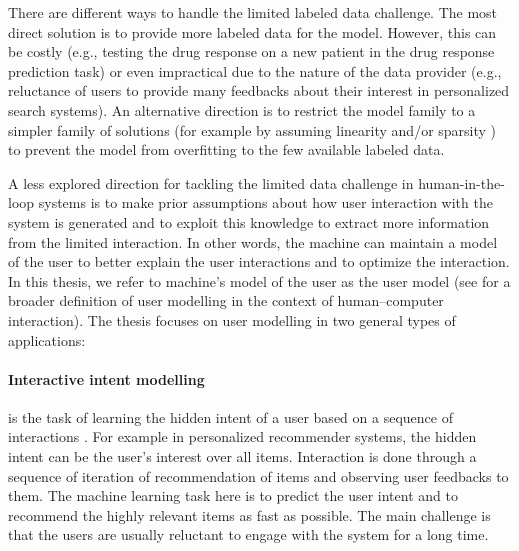 \documentclass[dissertation,math,vertlayout,pdfa,colorlinks]{aaltoseries}
\begin{document}

There are different ways to handle the limited labeled data challenge. The most direct solution is to provide more labeled data for the model. However, this can be costly (e.g., testing the drug response on a new patient in the drug response prediction task) or even impractical due to the nature of the data provider (e.g., reluctance of users to provide many feedbacks about their interest in personalized search systems). An alternative direction is to restrict the model family to a simpler family of solutions (for example by assuming linearity and/or sparsity \cite{lasso2011}) to prevent the model from overfitting to the few available labeled data. 

A less explored direction for tackling the limited data challenge in human-in-the-loop systems is to make prior assumptions about how user interaction with the system is generated and to exploit this knowledge to extract more information from the limited interaction. In other words, the machine can maintain a model of the user to better explain the user interactions and to optimize the interaction. In this thesis, we refer to machine's model of the user as the user model (see \cite{user_modelling_2001} for a broader definition of user modelling in the context of human--computer interaction). The thesis focuses on user modelling in two general types of applications:

\paragraph{Interactive intent modelling} is the task of learning the hidden intent of a user based on a sequence of interactions \cite{ruotsalo2015interactive}. For example in personalized recommender systems, the hidden intent can be the user's interest over all items. Interaction is done through a sequence of iteration of recommendation of items and observing user feedbacks to them. The machine learning task here is to predict the user intent and to recommend the highly relevant items as fast as possible. The main challenge is that the users are usually reluctant to engage with the system for a long time. %
\end{document}
